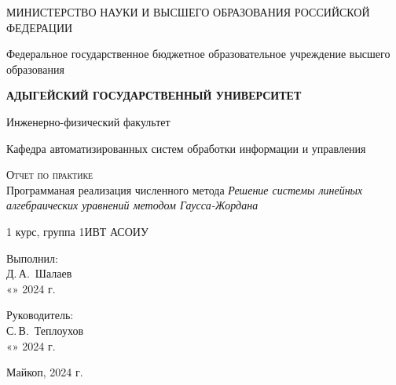 \documentclass[12pt,a4paper]{scrartcl}
\begin{document}
	\begin{titlepage}
		\begin{center}
			\large
			МИНИСТЕРСТВО НАУКИ И ВЫСШЕГО ОБРАЗОВАНИЯ РОССИЙСКОЙ ФЕДЕРАЦИИ
			
			Федеральное государственное бюджетное образовательное учреждение высшего образования
			
			\textbf{АДЫГЕЙСКИЙ ГОСУДАРСТВЕННЫЙ УНИВЕРСИТЕТ}
			\vspace{0.25cm}
			
			Инженерно-физический факультет
			
			Кафедра автоматизированных систем обработки информации и управления
			\vfill

			\vfill
			
			\textsc{Отчет по практике}\\[5mm]
			
			{\LARGE Программаная реализация численного метода \textit{Решение системы линейных алгебраических уравнений методом Гаусса-Жордана}}
			\bigskip
			
			1 курс, группа 1ИВТ АСОИУ
		\end{center}
		\vfill
		
		\newlength{\ML}
		\hfill\begin{minipage}{0.5\textwidth}
			Выполнил:\\
			\underline{\hspace{\ML}} Д.\,А.~Шалаев\\
			«\underline{\hspace{0.7cm}}» \underline{\hspace{2cm}} 2024 г.
		\end{minipage}%
		\bigskip
		
		\hfill\begin{minipage}{0.5\textwidth}
			Руководитель:\\
			\underline{\hspace{\ML}} С.\,В.~Теплоухов\\
			«\underline{\hspace{0.7cm}}» \underline{\hspace{2cm}} 2024 г.
		\end{minipage}%
		\vfill
		
		\begin{center}
			Майкоп, 2024 г.
		\end{center}
	\end{titlepage}
\end{document}
